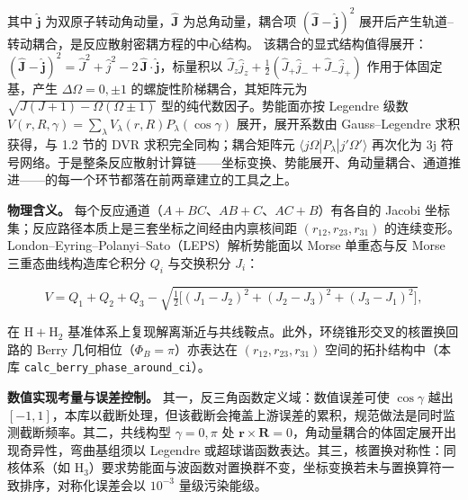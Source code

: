 \documentclass[
]{ctexbook}
\begin{document}
其中 \(\hat{\mathbf{j}}\) 为双原子转动角动量，\(\hat{\mathbf{J}}\)
为总角动量，耦合项 \((\hat{\mathbf{J}}-\hat{\mathbf{j}})^{2}\)
展开后产生轨道--转动耦合，是反应散射密耦方程的中心结构。
该耦合的显式结构值得展开：\((\hat{\mathbf{J}}-\hat{\mathbf{j}})^{2}=\hat{J}^{2}+\hat{j}^{2}-2\,\hat{\mathbf{J}}\cdot\hat{\mathbf{j}}\)，标量积以
\(\hat{J}_z\hat{j}_z+\tfrac12(\hat{J}_{+}\hat{j}_{-}+\hat{J}_{-}\hat{j}_{+})\)
作用于体固定基，产生 \(\Delta\Omega=0,\pm1\)
的螺旋性阶梯耦合，其矩阵元为 \(\sqrt{J(J+1)-\Omega(\Omega\pm1)}\)
型的纯代数因子。势能面亦按 Legendre 级数
\(V(r,R,\gamma)=\sum_{\lambda}V_{\lambda}(r,R)P_{\lambda}(\cos\gamma)\)
展开，展开系数由 Gauss--Legendre 求积获得，与 1.2 节的 DVR
求积完全同构；耦合矩阵元
\(\langle j\Omega|P_{\lambda}|j'\Omega'\rangle\) 再次化为 3j
符号网络。于是整条反应散射计算链------坐标变换、势能展开、角动量耦合、通道推进------的每一个环节都落在前两章建立的工具之上。

\textbf{物理含义。} 每个反应通道（\(A+BC\)、\(AB+C\)、\(AC+B\)）有各自的
Jacobi 坐标集；反应路径本质上是三套坐标之间经由内禀核间距
\((r_{12},r_{23},r_{31})\)
的连续变形。London--Eyring--Polanyi--Sato（LEPS）解析势能面以 Morse
单重态与反 Morse 三重态曲线构造库仑积分 \(Q_i\) 与交换积分 \(J_i\)：

\[V=Q_1+Q_2+Q_3-\sqrt{\tfrac12\bigl[(J_1-J_2)^{2}+(J_2-J_3)^{2}+(J_3-J_1)^{2}\bigr]},\]

在 \(\mathrm{H}+\mathrm{H}_2\)
基准体系上复现解离渐近与共线鞍点。此外，环绕锥形交叉的核置换回路的 Berry
几何相位（\(\Phi_B=\pi\)）亦表达在 \((r_{12},r_{23},r_{31})\)
空间的拓扑结构中（本库 \texttt{calc\_berry\_phase\_around\_ci}）。

\textbf{数值实现考量与误差控制。} 其一，反三角函数定义域：数值误差可使
\(\cos\gamma\) 越出
\([-1,1]\)，本库以截断处理，但该截断会掩盖上游误差的累积，规范做法是同时监测截断频率。其二，共线构型
\(\gamma=0,\pi\) 处
\(\mathbf{r}\times\mathbf{R}=0\)，角动量耦合的体固定展开出现奇异性，弯曲基组须以
Legendre 或超球谐函数表达。其三，核置换对称性：同核体系（如
\(\mathrm{H}_3\)）要求势能面与波函数对置换群不变，坐标变换若未与置换算符一致排序，对称化误差会以
\(10^{-3}\) 量级污染能级。
\end{document}
